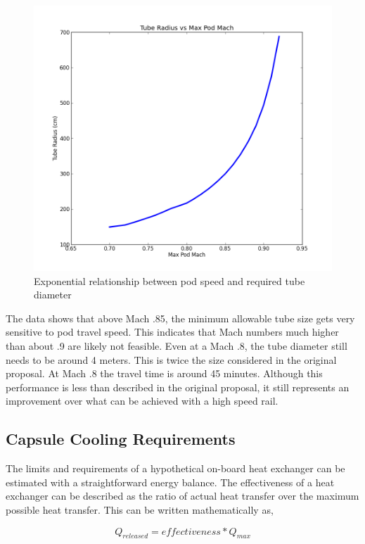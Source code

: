 \documentclass[heading.tex]{subfiles}
\begin{document}
\begin{figure}[hbtp]
\centering
\includegraphics[scale=0.5]{images/mach_vs_rad.png}
\caption{Exponential relationship between pod speed and required tube diameter}
\label{f:machRAD}
\end{figure}

The data shows that above Mach .85, the minimum allowable tube size gets very sensitive to pod travel speed. This indicates that Mach numbers much higher than about .9 are likely not feasible. Even at a Mach .8, the tube diameter still needs to be around 4 meters. This is twice the size considered in the original proposal. At Mach .8 the travel time is around 45 minutes. Although this performance is less than described in the original proposal, it still represents an improvement over what can be achieved with a high speed rail.

\subsection{Capsule Cooling Requirements}
The limits and requirements of a hypothetical on-board heat exchanger can be estimated with a straightforward energy balance. The effectiveness of a heat exchanger can be described as the ratio of actual heat transfer over the maximum possible heat transfer. This can be written mathematically as,

\begin{equation*}
{Q}_{released}  = effectiveness * {Q}_{max}
\end{equation*}
\end{document}
